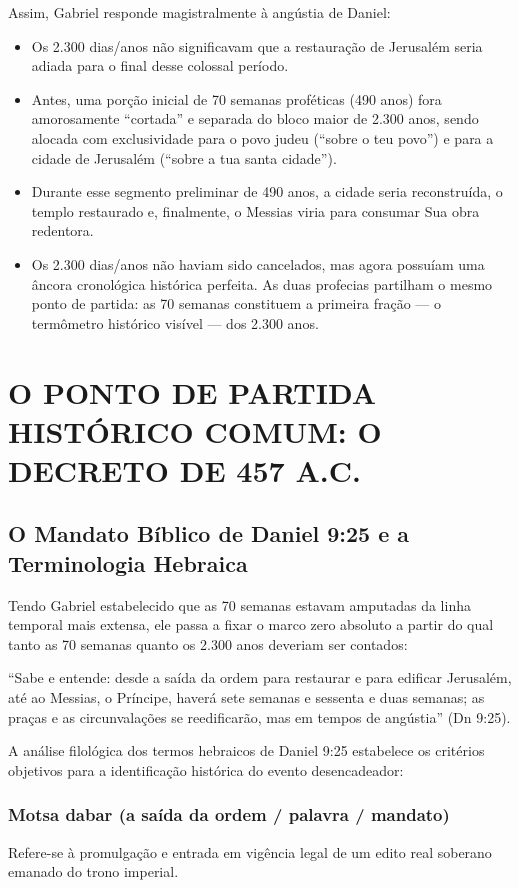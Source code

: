 \documentclass[11pt,a4paper,openany]{book}
\begin{document}
Assim, Gabriel responde magistralmente à angústia de Daniel:
\begin{itemize}
  \item Os 2.300 dias/anos não significavam que a restauração de Jerusalém seria adiada para o final desse colossal período.
  \item Antes, uma porção inicial de 70 semanas proféticas (490 anos) fora amorosamente ``cortada'' e separada do bloco maior de 2.300 anos, sendo alocada com exclusividade para o povo judeu (``sobre o teu povo'') e para a cidade de Jerusalém (``sobre a tua santa cidade'').
  \item Durante esse segmento preliminar de 490 anos, a cidade seria reconstruída, o templo restaurado e, finalmente, o Messias viria para consumar Sua obra redentora.
  \item Os 2.300 dias/anos não haviam sido cancelados, mas agora possuíam uma âncora cronológica histórica perfeita. As duas profecias partilham o mesmo ponto de partida: as 70 semanas constituem a primeira fração — o termômetro histórico visível — dos 2.300 anos.
\end{itemize}




\section{O PONTO DE PARTIDA HISTÓRICO COMUM: O DECRETO DE 457 A.C.}



\subsection{O Mandato Bíblico de Daniel 9:25 e a Terminologia Hebraica}


Tendo Gabriel estabelecido que as 70 semanas estavam amputadas da linha temporal mais extensa, ele passa a fixar o marco zero absoluto a partir do qual tanto as 70 semanas quanto os 2.300 anos deveriam ser contados:

``Sabe e entende: desde a saída da ordem para restaurar e para edificar Jerusalém, até ao Messias, o Príncipe, haverá sete semanas e sessenta e duas semanas; as praças e as circunvalações se reedificarão, mas em tempos de angústia'' (Dn 9:25).

A análise filológica dos termos hebraicos de Daniel 9:25 estabelece os critérios objetivos para a identificação histórica do evento desencadeador:

\subsubsection*{Motsa dabar (a saída da ordem / palavra / mandato)}
Refere-se à promulgação e entrada em vigência legal de um edito real soberano emanado do trono imperial.
\end{document}
